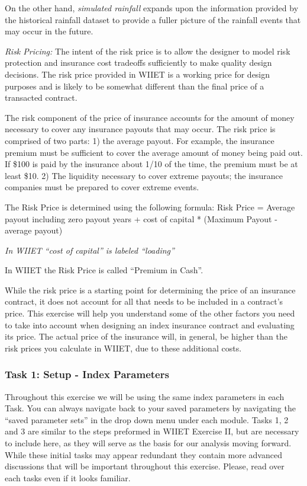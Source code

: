 \documentclass[letterpaper,10pt,english]{sphinxmanual}
\begin{document}
On the other hand, \emph{simulated rainfall} expands upon the information provided by the historical rainfall dataset to provide a fuller picture of the rainfall events that may occur in the future.

\emph{Risk Pricing:} The intent of the risk price is to allow the designer to model risk protection and insurance cost tradeoffs sufficiently to make quality design decisions. The risk price provided in WIIET is a working price for design purposes and is likely to be somewhat different than the final price of a transacted contract.

The risk component of the price of insurance accounts for the amount of money necessary to cover any insurance payouts that may occur. The risk price is comprised of two parts: 1) the average payout. For example, the insurance premium must be sufficient to cover the average amount of money being paid out. If \$100 is paid by the insurance about 1/10 of the time, the premium must be at least \$10. 2) The liquidity necessary to cover extreme payouts; the insurance companies must be prepared to cover extreme events.

The Risk Price is determined using the following formula:
Risk Price = Average payout including zero payout years + cost of capital * (Maximum Payout - average payout)

\emph{In WIIET ``cost of capital'' is labeled ``loading''}

In WIIET the Risk Price is called ``Premium in Cash''.

While the risk price is a starting point for determining the price of an insurance contract, it does not account for all that needs to be included in a contract's price.  This exercise will help you understand some of the other factors you need to take into account when designing an index insurance contract and evaluating its price. The actual price of the insurance will, in general, be higher than the risk prices you calculate in WIIET, due to these additional costs.


\subsubsection{Task 1: Setup - Index Parameters}
\label{wiiet/wiiet_initialtomarketpricing_Web:task-1-setup-index-parameters}
Throughout this exercise we will be using the same index parameters in each Task. You can always navigate back to your saved parameters by navigating the ``saved parameter sets'' in the drop down menu under each module. Tasks 1, 2 and 3 are similar to the steps preformed in WIIET Exercise II, but are necessary to include here, as they will serve as the basis for our analysis moving forward. While these initial tasks may appear redundant they contain more advanced discussions that will be important throughout this exercise. Please, read over each tasks even if it looks familiar.
\end{document}
